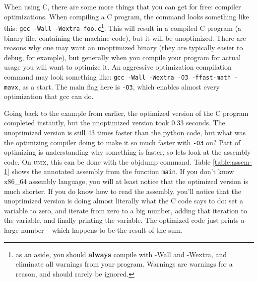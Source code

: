 When using C, there are some more things that you can get for free: compiler optimizations. When
compiling a C program, the command looks something like this: \texttt{gcc -Wall -Wextra foo.c}\footnote{as an aside, you should \textbf{always} compile with -Wall and -Wextra, and eliminate all warnings from your program.
Warnings are warnings for a reason, and should rarely be ignored.}. This will
result in a compiled C program (a binary file, containing the machine code), but it will be
unoptimized. There are reasons why one may want an unoptimized binary (they are typically
easier to debug, for example), but generally when you compile your program for actual usage
you will want to optimize it. An aggressive optimization compilation command may look something
like: \texttt{gcc -Wall -Wextra -O3 -ffast-math -mavx}, as a start. The main flag here is \texttt{-O3}, which
enables almost every optimization that gcc can do.

Going back to the example from earlier, the optimized version of the C program completed instantly, but
the unoptimized version took 0.33 seconds. The unoptimized version is still 43 times faster than the
python code, but what was the optimizing compiler doing to make it so much faster with \texttt{-O3} on?
Part of optimizing is understanding why something is faster, so lets look at the assembly code. On \textsc{unix},
this can be done with the objdump command. Table \ref{table:assem-1} shows the annotated assembly from
the function \texttt{main}. If you don't know x86\_64 assembly language, you will at least notice that the
optimized version is much shorter. If you do know how to read the assembly, you'll notice that the unoptimized
version is doing almost literally what the C code says to do: set a variable to zero, and iterate from zero to
a big number, adding that iteration to the variable, and finally printing the variable. The optimized code just prints a large number -- which happens to be the result of the sum.

